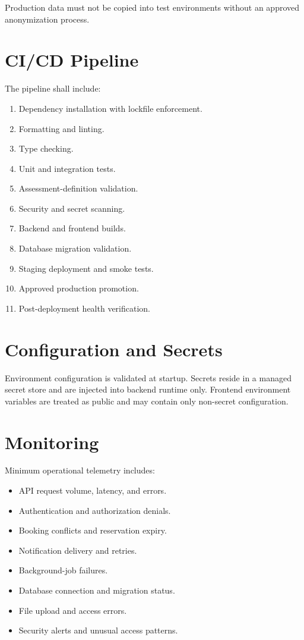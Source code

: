 \documentclass[11pt,a4paper,oneside]{report}
\begin{document}
Production data must not be copied into test environments without an approved anonymization process.

\section{CI/CD Pipeline}

The pipeline shall include:

\begin{enumerate}
  \item Dependency installation with lockfile enforcement.
  \item Formatting and linting.
  \item Type checking.
  \item Unit and integration tests.
  \item Assessment-definition validation.
  \item Security and secret scanning.
  \item Backend and frontend builds.
  \item Database migration validation.
  \item Staging deployment and smoke tests.
  \item Approved production promotion.
  \item Post-deployment health verification.
\end{enumerate}

\section{Configuration and Secrets}

Environment configuration is validated at startup. Secrets reside in a managed secret store and are injected into backend runtime only. Frontend environment variables are treated as public and may contain only non-secret configuration.

\section{Monitoring}

Minimum operational telemetry includes:

\begin{itemize}
  \item API request volume, latency, and errors.
  \item Authentication and authorization denials.
  \item Booking conflicts and reservation expiry.
  \item Notification delivery and retries.
  \item Background-job failures.
  \item Database connection and migration status.
  \item File upload and access errors.
  \item Security alerts and unusual access patterns.
\end{itemize}
\end{document}
